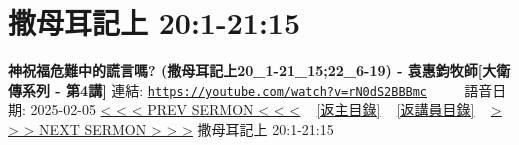 \documentclass{book}
\begin{document}
\section{撒母耳記上 20:1-21:15}
\label{sec:rN0dS2BBBmc}
\textbf{神祝福危難中的謊言嗎?  (撒母耳記上20\_1-21\_15;22\_6-19) - 袁惠鈞牧師[大衛傳系列 - 第4講]}
\newline
\newline
連結: \href{https://youtube.com/watch?v=rN0dS2BBBmc}{\texttt{https://youtube.com/watch?v=rN0dS2BBBmc}} ~~~~ 語音日期: 2025-02-05
\newline
\newline
\hyperref[sec:9t69tF6ci0k]{< < < PREV SERMON < < <}
~
\hyperlink{toc}{[返主目錄]}
~
\hyperref[ch:preacher12]{[返講員目錄]}
~
\hyperref[sec:WCt7vYrgwVY]{> > > NEXT SERMON > > >}
\newline
\newline
撒母耳記上 20:1-21:15
\newline
\end{document}
